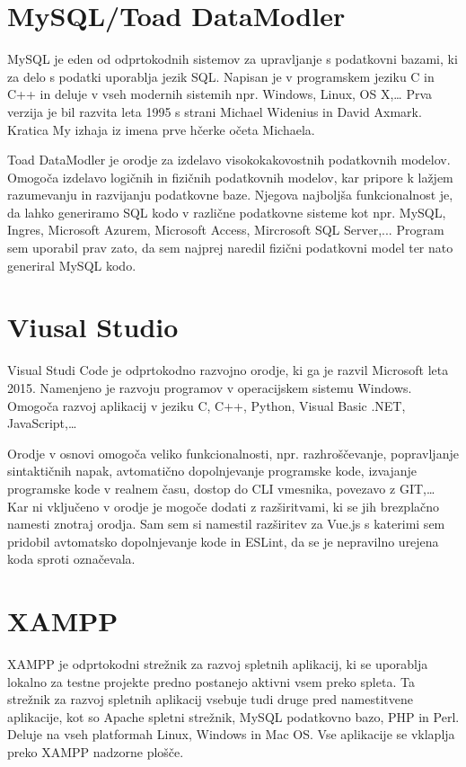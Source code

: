 \documentclass[a4paper, 12pt]{book}
\begin{document}
\section {MySQL/Toad DataModler}
MySQL je eden od odprtokodnih sistemov za upravljanje s podatkovni bazami, ki za delo s podatki uporablja jezik SQL. Napisan je v programskem jeziku C in C++ in deluje v vseh modernih sistemih npr. Windows, Linux, OS X,… Prva verzija je bil razvita leta 1995 s strani Michael Widenius in David Axmark. Kratica My izhaja iz imena prve hčerke očeta Michaela.  


Toad DataModler je orodje za izdelavo visokokakovostnih podatkovnih modelov. Omogoča izdelavo logičnih in fizičnih podatkovnih modelov, kar pripore k lažjem razumevanju in razvijanju podatkovne baze. Njegova najboljša funkcionalnost je, da lahko generiramo SQL kodo v različne podatkovne sisteme kot npr. MySQL, Ingres, Microsoft Azurem, Microsoft Access, Mircrosoft SQL Server,... Program sem uporabil prav zato, da sem najprej naredil fizični podatkovni model ter nato generiral MySQL kodo. 

\section {Viusal Studio}
Visual Studi Code je odprtokodno razvojno orodje, ki ga je razvil Microsoft leta 2015. Namenjeno je razvoju programov v operacijskem sistemu Windows. Omogoča razvoj aplikacij v jeziku C, C++, Python, Visual Basic .NET, JavaScript,… 

Orodje v osnovi omogoča veliko funkcionalnosti, npr. razhroščevanje, popravljanje sintaktičnih napak, avtomatično dopolnjevanje programske kode, izvajanje programske kode v realnem času, dostop do CLI vmesnika, povezavo z GIT,… Kar ni vključeno v orodje je mogoče dodati z razširitvami, ki se jih brezplačno namesti znotraj orodja. Sam sem si namestil razširitev za Vue.js s katerimi sem pridobil avtomatsko dopolnjevanje kode in ESLint, da se je nepravilno urejena koda sproti označevala.  

\section {XAMPP}
XAMPP je odprtokodni strežnik za razvoj spletnih aplikacij, ki se uporablja lokalno za testne projekte predno postanejo aktivni vsem preko spleta. Ta strežnik za razvoj spletnih aplikacij vsebuje tudi druge pred namestitvene aplikacije, kot so Apache spletni strežnik, MySQL podatkovno bazo, PHP in Perl. Deluje na vseh platformah Linux, Windows in Mac OS. Vse aplikacije se vklaplja preko XAMPP nadzorne plošče.
\end{document}
